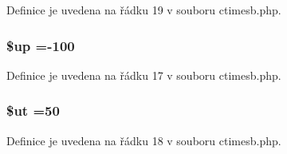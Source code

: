 Definice je uvedena na řádku 19 v souboru ctimesb.\-php.

\hypertarget{ctimesb_8php_a6b5ad2ac55f9df46e8f34e78fbd6f176}{
\subsubsection[{\$up}]{\setlength{\rightskip}{0pt plus 5cm}\$up =-\/100}}\label{ctimesb_8php_a6b5ad2ac55f9df46e8f34e78fbd6f176}


Definice je uvedena na řádku 17 v souboru ctimesb.\-php.

\hypertarget{ctimesb_8php_aadd3f841051043ee58e587e840e8dd0b}{
\subsubsection[{\$ut}]{\setlength{\rightskip}{0pt plus 5cm}\$ut =50}}\label{ctimesb_8php_aadd3f841051043ee58e587e840e8dd0b}


Definice je uvedena na řádku 18 v souboru ctimesb.\-php.

